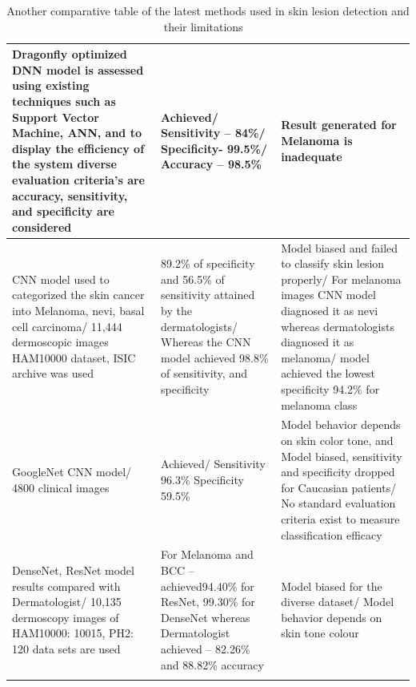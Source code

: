\begin{longtable}{p{4cm}|p{4cm}|p{6cm}}
        \hline
        Dragonfly optimized DNN model is assessed using existing techniques such as Support Vector Machine, ANN, and to display the efficiency of the system diverse evaluation criteria’s are accuracy, sensitivity, and specificity are considered & Achieved/ Sensitivity – 84\%/ Specificity- 99.5\%/ Accuracy – 98.5\% & Result generated for Melanoma is inadequate\\
        \hline
        CNN model used to categorized the skin cancer into Melanoma, nevi, basal cell carcinoma/ 11,444 dermoscopic images HAM10000 dataset, ISIC archive was used & 89.2\% of specificity and 56.5\% of sensitivity attained by the dermatologists/ Whereas the CNN model achieved 98.8\% of sensitivity, and specificity & Model biased and failed to classify skin lesion properly/ For melanoma images CNN model diagnosed it as nevi whereas dermatologists diagnosed it as melanoma/ model achieved the lowest specificity 94.2\% for melanoma class\\
        \hline
        GoogleNet CNN model/ 4800 clinical images & Achieved/ Sensitivity 96.3\% Specificity 59.5\% & Model behavior depends on skin color tone, and Model biased, sensitivity and specificity dropped for Caucasian patients/ No standard evaluation criteria exist to measure classification efficacy\\
        \hline
        DenseNet, ResNet model results compared with Dermatologist/ 10,135 dermoscopy images of HAM10000: 10015, PH2: 120 data sets are used & For Melanoma and BCC – achieved94.40\% for ResNet, 99.30\% for DenseNet whereas Dermatologist achieved – 82.26\% and 88.82\% accuracy & Model biased for the diverse dataset/ Model behavior depends on skin tone colour\\
        \hline
        \caption{Another comparative table of the latest methods used in skin lesion detection and their limitations ~\cite{Naresh2020}}
        \label{tab:second}
    \end{longtable} 
 
